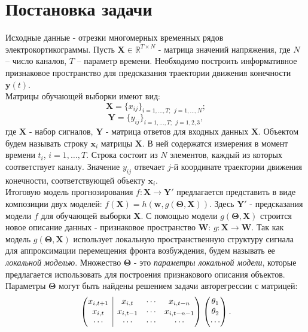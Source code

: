 \documentclass[12pt,twoside]{article}
\begin{document}
\section{Постановка задачи}
Исходные данные - отрезки многомерных временных рядов электрокортикограммы. Пусть $\mathbf{X} \in \mathbb{R}^{T \times N}$ - матрица значений напряжения, где $N$ – число каналов, $T$ – параметр времени. Необходимо построить информативное признаковое пространство для предсказания траектории движения конечности $\mathbf{y}(t)$. \\
Матрицы обучающей выборки имеют вид:
\begin{equation}
\mathbf{X} = \{x_{ij}\}_{i=1,\dots,T;\ \ j=1,\dots,N};
\end{equation} 
\begin{equation}
\mathbf{Y} = \{y_{ij}\}_{i=1,\dots,T;\ \ j=1,2,3},
\end{equation}
где $\mathbf{X}$ - набор сигналов, $\mathbf{Y}$ - матрица ответов для входных данных $\mathbf{X}$. Объектом будем называть строку $\mathbf{x}_i$ матрицы $\mathbf{X}$. В ней содержатся измерения в момент времени $t_i$, $i = 1,\dots,T$. Строка состоит из $N$ элементов, каждый из которых соответствует каналу. Значение $y_{ij}$ отвечает $j$-й координате траектории движения конечности, соответствующей объекту $\mathbf{x}_i$.\\
Итоговую модель прогнозирования $f:\mathbf{X}\to\mathbf{Y}'$ предлагается представить в виде композиции двух моделей: $f(\mathbf{X})=h(\mathbf{w}, g(\mathbf{\Theta}, \mathbf{X}))$. Здесь $\mathbf{Y}'$ - предсказания модели $f$ для обучающей выборки $\mathbf{X}$. С помощью модели $g(\mathbf{\Theta}, \mathbf{X})$ строится новое описание данных - признаковое пространство $\mathbf{W}$: $g:\mathbf{X}\to\mathbf{W}$. Так как модель $g(\mathbf{\Theta}, \mathbf{X})$ использует локальную пространственную структуру сигнала для аппроксимации перемещения фронта возбуждения, будем называть ее \textit{локальной моделью}.
 Множество $\mathbf{\Theta}$ - это \textit{параметры локальной модели}, которые предлагается использовать для построения признакового описания объектов. Параметры $\mathbf{\Theta}$ могут быть найдены решением задачи авторегрессии с матрицей:
\begin{equation}
\left(\begin{array}{@{}c|ccc@{}}
x_{i, t+1} & x_{i, t}   & \cdots & x_{i, t-n}   \\
x_{i, t}   & x_{i, t-1} & \cdots & x_{i, t-n-1} \\
\cdots     & \cdots     & \cdots & \cdots
\end{array}\right)
\begin{pmatrix}
\theta_1 \\
\theta_2 \\
\cdots
\end{pmatrix}.
\end{equation}
\end{document}
